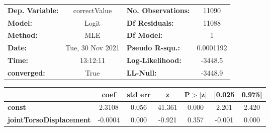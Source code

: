 \begin{center}
\begin{tabular}{lclc}
\toprule
\textbf{Dep. Variable:}         &   correctValue   & \textbf{  No. Observations:  } &    11090    \\
\textbf{Model:}                 &      Logit       & \textbf{  Df Residuals:      } &    11088    \\
\textbf{Method:}                &       MLE        & \textbf{  Df Model:          } &        1    \\
\textbf{Date:}                  & Tue, 30 Nov 2021 & \textbf{  Pseudo R-squ.:     } & 0.0001192   \\
\textbf{Time:}                  &     13:12:11     & \textbf{  Log-Likelihood:    } &   -3448.5   \\
\textbf{converged:}             &       True       & \textbf{  LL-Null:           } &   -3448.9   \\
\bottomrule
\end{tabular}
\begin{tabular}{lcccccc}
                                & \textbf{coef} & \textbf{std err} & \textbf{z} & \textbf{P$> |$z$|$} & \textbf{[0.025} & \textbf{0.975]}  \\
\midrule
\textbf{const}                  &       2.3108  &        0.056     &    41.361  &         0.000        &        2.201    &        2.420     \\
\textbf{jointTorsoDisplacement} &      -0.0004  &        0.000     &    -0.921  &         0.357        &       -0.001    &        0.000     \\
\bottomrule
\end{tabular}
\end{center}